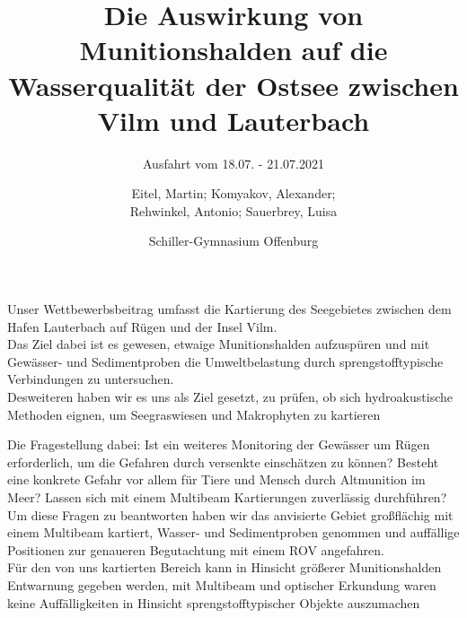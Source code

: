 \documentclass[12pt,titlepage]{scrreprt}
\begin{document}
% 
\begin{titlepage}

	

\title{Die Auswirkung von Munitionshalden auf die Wasserqualität der Ostsee zwischen Vilm und Lauterbach}
\subtitle{Ausfahrt vom 18.07. - 21.07.2021}
\titlehead{\centering\texttt{[image: Bilder/DSC05220]}}


\author{Eitel, Martin; Komyakov, Alexander; \\ Rehwinkel, Antonio; Sauerbrey, Luisa\\ \and Schiller-Gymnasium Offenburg}

\publishers{Wissenschaftspate: Prof Dr. Jens Greinert \texttt{jgreinert@geomar.de} \\
\vspace*{2ex} Betreuer: Marek Czernohous \texttt{m.czernohous@schiller-offenburg.de}}

\maketitle

\end{titlepage}
Unser Wettbewerbsbeitrag umfasst die Kartierung des Seegebietes zwischen dem Hafen Lauterbach auf Rügen und der Insel Vilm. \\ Das Ziel dabei ist es gewesen, etwaige Munitionshalden aufzuspüren und mit Gewässer- und Sedimentproben die Umweltbelastung durch sprengstofftypische Verbindungen zu untersuchen. \\ 
Desweiteren haben wir es uns als Ziel gesetzt, zu prüfen, ob sich hydroakustische Methoden eignen, um Seegraswiesen und Makrophyten zu kartieren

Die Fragestellung dabei: Ist ein weiteres Monitoring der Gewässer um Rügen erforderlich, um die Gefahren durch versenkte einschätzen zu können? Besteht eine konkrete Gefahr vor allem für Tiere und Mensch durch Altmunition im Meer? Lassen sich mit einem Multibeam Kartierungen zuverlässig durchführen?\\ Um diese Fragen zu beantworten haben wir das anvisierte Gebiet großflächig mit einem Multibeam kartiert, Wasser- und Sedimentproben genommen und auffällige Positionen zur genaueren Begutachtung mit einem ROV angefahren.\\

Für den von uns kartierten Bereich kann in Hinsicht größerer Munitionshalden Entwarnung gegeben werden, mit Multibeam und optischer Erkundung waren keine Auffälligkeiten in Hinsicht sprengstofftypischer Objekte auszumachen
\end{document}

